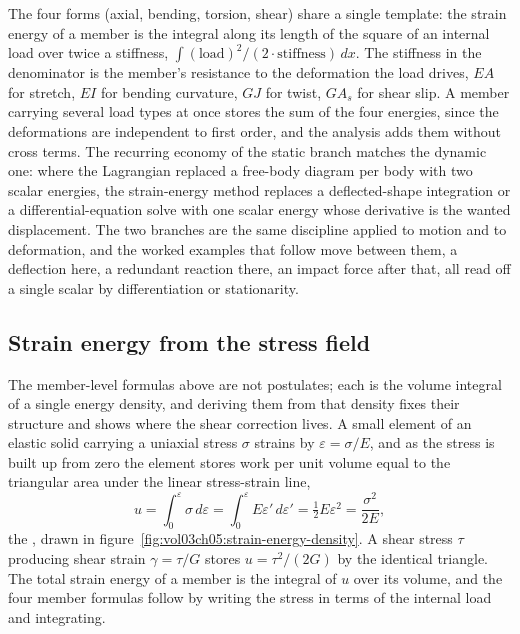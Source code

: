 The four forms (axial, bending, torsion, shear) share a single template:
the strain energy of a member is the integral along its length of the square
of an internal load over twice a stiffness, $\int (\text{load})^2 /
(2\cdot\text{stiffness})\,dx$. The stiffness in the denominator is the
member's resistance to the deformation the load drives, $EA$ for stretch,
$EI$ for bending curvature, $GJ$ for twist, $GA_s$ for shear slip. A member
carrying several load types at once stores the sum of the four energies,
since the deformations are independent to first order, and the analysis adds
them without cross terms. The recurring economy of the static branch matches
the dynamic one: where the Lagrangian replaced a free-body diagram per body
with two scalar energies, the strain-energy method replaces a deflected-shape
integration or a differential-equation solve with one scalar energy whose
derivative is the wanted displacement. The two branches are the same
discipline applied to motion and to deformation, and the worked examples
that follow move between them, a deflection here, a redundant reaction there,
an impact force after that, all read off a single scalar by differentiation
or stationarity.

\subsection{Strain energy from the stress field}

The member-level formulas above are not postulates; each is the volume
integral of a single energy density, and deriving them from that density
fixes their structure and shows where the shear correction lives. A small
element of an elastic solid carrying a uniaxial stress $\sigma$ strains by
$\varepsilon = \sigma/E$, and as the stress is built up from zero the
element stores work per unit volume equal to the triangular area under the
linear stress-strain line,
\[
u = \int_0^{\varepsilon}\sigma\,d\varepsilon
= \int_0^{\varepsilon}E\varepsilon'\,d\varepsilon'
= \tfrac12 E\varepsilon^2
= \frac{\sigma^2}{2E},
\]
the , drawn in
figure~\ref{fig:vol03ch05:strain-energy-density}. A shear stress $\tau$
producing shear strain $\gamma = \tau/G$ stores $u = \tau^2/(2G)$ by the
identical triangle. The total strain energy of a member is the integral of
$u$ over its volume, and the four member formulas follow by writing the
stress in terms of the internal load and integrating.



